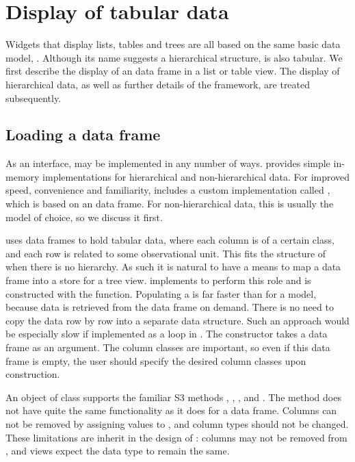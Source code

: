 \section{Display of tabular data}
\label{sec:RGtk2:tabular-heirarchical-data}

Widgets that display lists, tables and trees are all based on the same
basic data model, . Although its name suggests a
hierarchical structure,  is also tabular. We first
describe the display of an \R\/ data frame in a list or table
view. The display of hierarchical data, as well as further details of
the  framework, are treated subsequently.

\subsection{Loading a data frame}
\label{sec:tabular-stores-tree}

As an interface,  may be implemented in any number
of ways. \GTK\/ provides simple in-memory implementations for
hierarchical and non-hierarchical data. For improved speed,
convenience and familiarity,  includes a custom
 implementation called , which
is based on an \R\/ data frame. For non-hierarchical data, this is
usually the model of choice, so we discuss it first.

\R\/ uses data frames to hold tabular data, where each column is of a
certain class, and each row is related to some observational
unit. This fits the structure of  when there is no
hierarchy. As such it is natural to have a means to map a data frame
into a store for a tree view.  implements
 to perform this role and is constructed with the
 function. Populating a
 is far faster than for a \GTK\/ model, because
data is retrieved from the data frame on demand. There is no need to
copy the data row by row into a separate data structure. Such an
approach would be especially slow if implemented as a loop in \R. The
constructor takes a data frame as an argument. The column classes are
important, so even if this data frame is empty, the user should
specify the desired column classes upon construction.

An object of class  supports the familiar S3
methods \method{[}{RGtkDataFrame}, \method{[\ASSIGN}{RGtkDataFrame},
, and
. The \code{[$<$-} method does
not have quite the same functionality as it does for a data
frame. Columns can not be removed by assigning values to ,
and column types should not be changed. These limitations are inherit
in the design of \GTK: columns may not be removed from
, and views expect the data type to remain the
same.

